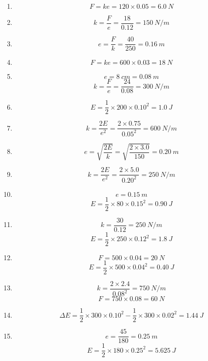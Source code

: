 \documentclass[12pt,a4paper]{article}
\begin{document}
\begin{enumerate}[label=\textbf{\arabic*.}]

\item
\[
F = ke = 120 \times 0.05 = \SI{6.0}{N}
\]

\item
\[
k = \frac{F}{e} = \frac{18}{0.12} = \SI{150}{N/m}
\]

\item
\[
e = \frac{F}{k} = \frac{40}{250} = \SI{0.16}{m}
\]

\item
\[
F = ke = 600 \times 0.03 = \SI{18}{N}
\]

\item
\[
e = \SI{8}{cm} = \SI{0.08}{m}
\]
\[
k = \frac{F}{e} = \frac{24}{0.08} = \SI{300}{N/m}
\]

\item
\[
E = \frac{1}{2} \times 200 \times 0.10^2 = \SI{1.0}{J}
\]

\item
\[
k = \frac{2E}{e^2} = \frac{2 \times 0.75}{0.05^2} = \SI{600}{N/m}
\]

\item
\[
e = \sqrt{\frac{2E}{k}} = \sqrt{\frac{2 \times 3.0}{150}} = \SI{0.20}{m}
\]

\item
\[
k = \frac{2E}{e^2} = \frac{2 \times 5.0}{0.20^2} = \SI{250}{N/m}
\]

\item
\[
e = \SI{0.15}{m}
\]
\[
E = \frac{1}{2} \times 80 \times 0.15^2 = \SI{0.90}{J}
\]

\item
\[
k = \frac{30}{0.12} = \SI{250}{N/m}
\]
\[
E = \frac{1}{2} \times 250 \times 0.12^2 = \SI{1.8}{J}
\]

\item
\[
F = 500 \times 0.04 = \SI{20}{N}
\]
\[
E = \frac{1}{2} \times 500 \times 0.04^2 = \SI{0.40}{J}
\]

\item
\[
k = \frac{2 \times 2.4}{0.08^2} = \SI{750}{N/m}
\]
\[
F = 750 \times 0.08 = \SI{60}{N}
\]

\item
\[
\Delta E = \frac{1}{2} \times 300 \times 0.10^2 - \frac{1}{2} \times 300 \times 0.02^2 = \SI{1.44}{J}
\]

\item
\[
e = \frac{45}{180} = \SI{0.25}{m}
\]
\[
E = \frac{1}{2} \times 180 \times 0.25^2 = \SI{5.625}{J}
\]

\end{enumerate}
\end{document}
